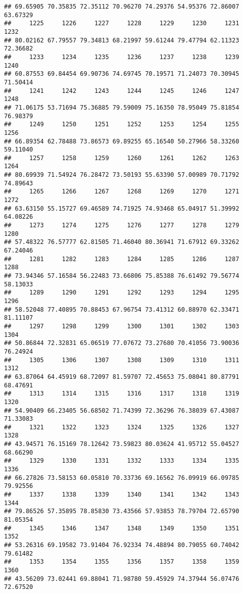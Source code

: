 \documentclass[
]{article}
\begin{document}
\begin{verbatim}
## 69.65905 70.35835 72.35112 70.96270 74.29376 54.95376 72.86007 63.67329 
##     1225     1226     1227     1228     1229     1230     1231     1232 
## 80.02162 67.79557 79.34813 68.21997 59.61244 79.47794 62.11323 72.36682 
##     1233     1234     1235     1236     1237     1238     1239     1240 
## 60.87553 69.84454 69.90736 74.69745 70.19571 71.24073 70.30945 71.50414 
##     1241     1242     1243     1244     1245     1246     1247     1248 
## 71.06175 53.71694 75.36885 79.59009 75.16350 78.95049 75.81854 76.98379 
##     1249     1250     1251     1252     1253     1254     1255     1256 
## 66.89354 62.78488 73.86573 69.89255 65.16540 50.27966 58.33260 59.11040 
##     1257     1258     1259     1260     1261     1262     1263     1264 
## 80.69939 71.54924 76.28472 73.50193 55.63390 57.00989 70.71792 74.89643 
##     1265     1266     1267     1268     1269     1270     1271     1272 
## 63.63150 55.15727 69.46589 74.71925 74.93468 65.04917 51.39992 64.08226 
##     1273     1274     1275     1276     1277     1278     1279     1280 
## 57.48322 76.57777 62.81505 71.46040 80.36941 71.67912 69.33262 67.24046 
##     1281     1282     1283     1284     1285     1286     1287     1288 
## 73.94346 57.16584 56.22483 73.66806 75.85388 76.61492 79.56774 58.13033 
##     1289     1290     1291     1292     1293     1294     1295     1296 
## 58.52048 77.40895 70.88453 67.96754 73.41312 60.88970 62.33471 81.11107 
##     1297     1298     1299     1300     1301     1302     1303     1304 
## 50.86844 72.32831 65.06519 77.07672 73.27680 70.41056 73.90036 76.24924 
##     1305     1306     1307     1308     1309     1310     1311     1312 
## 63.87064 64.45919 68.72097 81.59707 72.45653 75.08041 80.87791 68.47691 
##     1313     1314     1315     1316     1317     1318     1319     1320 
## 54.90409 66.23405 56.68502 71.74399 72.36296 76.38039 67.43087 71.33083 
##     1321     1322     1323     1324     1325     1326     1327     1328 
## 43.94571 76.15169 78.12642 73.59823 80.03624 41.95712 55.04527 68.66290 
##     1329     1330     1331     1332     1333     1334     1335     1336 
## 66.27826 73.58153 60.05810 70.33736 69.16562 76.09919 66.09785 79.92556 
##     1337     1338     1339     1340     1341     1342     1343     1344 
## 79.86526 57.35895 78.85830 73.43566 57.93853 78.79704 72.65790 81.05354 
##     1345     1346     1347     1348     1349     1350     1351     1352 
## 53.26316 69.19582 73.91404 76.92334 74.48894 80.79055 60.74042 79.61482 
##     1353     1354     1355     1356     1357     1358     1359     1360 
## 43.56209 73.02441 69.88041 71.98780 59.45929 74.37944 56.07476 72.67520 

\end{verbatim}
\end{document}
